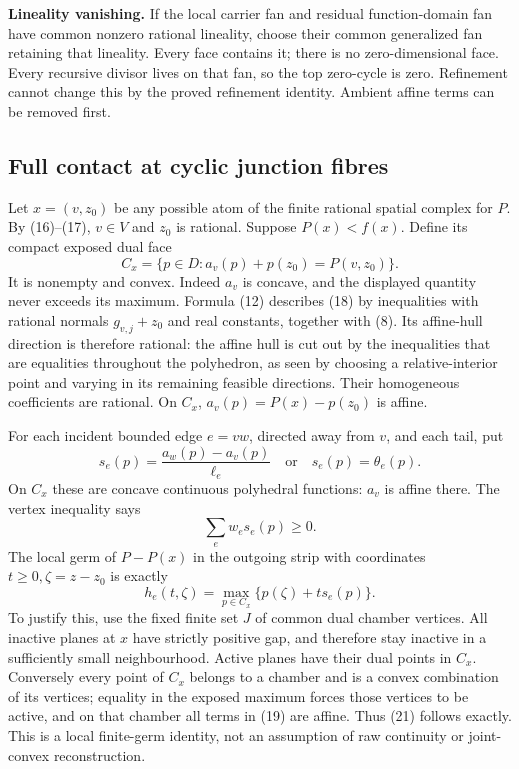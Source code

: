 \documentclass[
  11pt,
]{article}
\begin{document}
\textbf{Lineality vanishing.} If the local carrier fan and residual
function-domain fan have common nonzero rational lineality, choose their
common generalized fan retaining that lineality. Every face contains it;
there is no zero-dimensional face. Every recursive divisor lives on that
fan, so the top zero-cycle is zero. Refinement cannot change this by the
proved refinement identity. Ambient affine terms can be removed first.

\subsection{Full contact at cyclic junction
fibres}\label{full-contact-at-cyclic-junction-fibres}

Let \(x=(v,z_0)\) be any possible atom of the finite rational spatial
complex for \(P\). By (16)--(17), \(v\in V\) and \(z_0\) is rational.
Suppose \(P(x)<f(x)\). Define its compact exposed dual face \[
 C_x=\{p\in D:a_v(p)+p(z_0)=P(v,z_0)\}.                                  \tag{18}
\] It is nonempty and convex. Indeed \(a_v\) is concave, and the
displayed quantity never exceeds its maximum. Formula (12) describes
(18) by inequalities with rational normals \(g_{v,j}+z_0\) and real
constants, together with (8). Its affine-hull direction is therefore
rational: the affine hull is cut out by the inequalities that are
equalities throughout the polyhedron, as seen by choosing a
relative-interior point and varying in its remaining feasible
directions. Their homogeneous coefficients are rational. On \(C_x\),
\(a_v(p)=P(x)-p(z_0)\) is affine.

For each incident bounded edge \(e=vw\), directed away from \(v\), and
each tail, put \[
 s_e(p)=\frac{a_w(p)-a_v(p)}{\ell_e}\quad\text{or}\quad s_e(p)=\theta_e(p).
                                                                         \tag{19}
\] On \(C_x\) these are concave continuous polyhedral functions: \(a_v\)
is affine there. The vertex inequality says \[
                           \sum_e w_es_e(p)\geq0.                         \tag{20}
\] The local germ of \(P-P(x)\) in the outgoing strip with coordinates
\(t\geq0, \zeta=z-z_0\) is exactly \[
                  h_e(t,\zeta)=\max_{p\in C_x}\{p(\zeta)+t s_e(p)\}.       \tag{21}
\] To justify this, use the fixed finite set \(J\) of common dual
chamber vertices. All inactive planes at \(x\) have strictly positive
gap, and therefore stay inactive in a sufficiently small neighbourhood.
Active planes have their dual points in \(C_x\). Conversely every point
of \(C_x\) belongs to a chamber and is a convex combination of its
vertices; equality in the exposed maximum forces those vertices to be
active, and on that chamber all terms in (19) are affine. Thus (21)
follows exactly. This is a local finite-germ identity, not an assumption
of raw continuity or joint-convex reconstruction.
\end{document}
